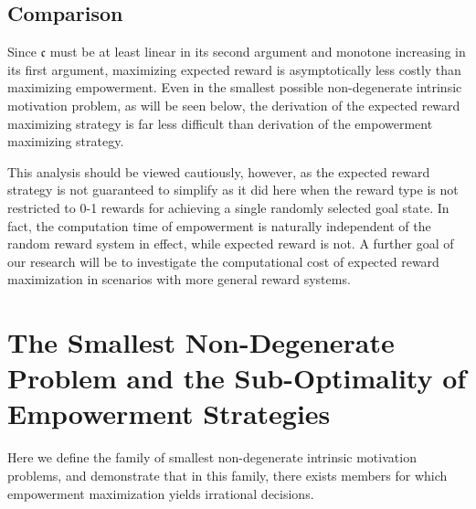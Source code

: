 \documentclass{article}
\begin{document}

\subsection{Comparison}
Since $\mathfrak{c}$ must be at least linear in its second argument and monotone increasing in its first argument, maximizing expected reward is asymptotically less costly than maximizing empowerment. Even in the smallest possible non-degenerate intrinsic motivation problem, as will be seen below, the derivation of the expected reward maximizing strategy is far less difficult than derivation of the empowerment maximizing strategy. 

This analysis should be viewed cautiously, however, as the expected reward strategy is not guaranteed to simplify as it did here when the reward type is not restricted to 0-1 rewards for achieving a single randomly selected goal state.  In fact, the computation time of empowerment is naturally independent of the random reward system in effect, while expected reward is not. A further goal of our research will be to investigate the computational cost of expected reward maximization in scenarios with more general reward systems.

\section{The Smallest Non-Degenerate Problem and the Sub-Optimality of Empowerment Strategies}
Here we define the family of smallest non-degenerate intrinsic motivation problems, and demonstrate that in this family, there exists members for which empowerment maximization yields irrational decisions.
\end{document}
